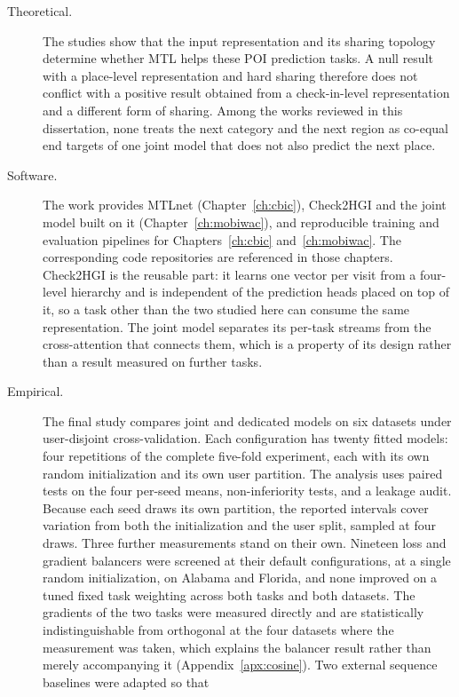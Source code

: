 \begin{description}
    \item[Theoretical.] The studies show that the input representation and its sharing
    topology determine whether MTL helps these POI prediction tasks. A null result
    with a place-level representation and hard sharing therefore does not conflict
    with a positive result obtained from a check-in-level representation and a
    different form of sharing. Among the works reviewed in this dissertation, none treats
    the next category and the next region as co-equal end targets of one joint model that
    does not also predict the next place.
    \item[Software.] The work provides MTLnet (Chapter~\ref{ch:cbic}), Check2HGI and the
    joint model built on it (Chapter~\ref{ch:mobiwac}), and reproducible training
    and evaluation pipelines for Chapters~\ref{ch:cbic} and~\ref{ch:mobiwac}. The
    corresponding code repositories are referenced in those chapters. Check2HGI is the
    reusable part: it learns one vector per visit from a four-level hierarchy and is
    independent of the prediction heads placed on top of it, so a task other than the
    two studied here can consume the same representation. The joint model separates its
    per-task streams from the cross-attention that connects them, which is a property of
    its design rather than a result measured on further tasks.
    \item[Empirical.] The final study compares joint and dedicated models on six
    datasets under user-disjoint cross-validation. Each configuration has twenty
    fitted models: four repetitions of the complete five-fold experiment, each
    with its own random initialization and its own user partition. The analysis
    uses paired tests on the four per-seed means, non-inferiority tests, and a
    leakage audit. Because each seed draws its own partition, the reported intervals
    cover variation from both the initialization and the user split, sampled at four
    draws. Three further measurements stand on their own. Nineteen loss and gradient
    balancers were screened at their default configurations, at a single random
    initialization, on Alabama and Florida, and none improved on a tuned fixed task
    weighting across both tasks and both datasets. The gradients of the two tasks were
    measured directly and are statistically indistinguishable from orthogonal at the four
    datasets where the measurement was taken, which explains the balancer result rather
    than merely accompanying it (Appendix~\ref{apx:cosine}). Two external sequence baselines were adapted so that

\end{description}
